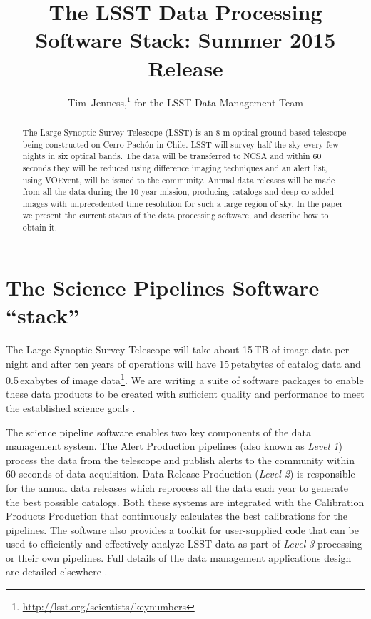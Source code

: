 \documentclass[11pt,twoside]{article}
\begin{document}
\title{The LSST Data Processing Software Stack: Summer 2015 Release}
\author{Tim~Jenness,$^1$ for the LSST Data Management Team
}


\begin{abstract}
  The Large Synoptic Survey Telescope (LSST) is an 8-m optical
  ground-based telescope being constructed on Cerro Pach\'on in
  Chile. LSST will survey half the sky every few nights in six optical
  bands. The data will be transferred to NCSA and within 60 seconds
  they will be reduced using difference imaging techniques and an
  alert list, using VOEvent, will be issued to the community. Annual
  data releases will be made from all the data during the 10-year
  mission, producing catalogs and deep co-added images with
  unprecedented time resolution for such a large region of sky. In the
  paper we present the current status of the data processing software,
  and describe how to obtain it.
\end{abstract}

\section{The Science Pipelines Software ``stack''}

The Large Synoptic Survey Telescope
\citep[LSST;][]{2008arXiv0805.2366I} will take about 15\,TB of image
data per night and after ten years of operations will have
15\,petabytes of catalog data and 0.5\,exabytes of image
data\footnote{\url{http://lsst.org/scientists/keynumbers}}. We are
writing a suite of software packages to enable these data products to
be created with sufficient quality and performance to meet the
established science goals \citep{2009arXiv0912.0201L}.

The science pipeline software enables two key components of the data
management system. The Alert Production pipelines (also known as
\emph{Level 1}) process the data from the telescope and publish alerts
to the community within 60 seconds of data acquisition. Data Release
Production (\emph{Level 2}) is responsible for the annual data
releases which reprocess all the data each year to generate the best
possible catalogs. Both these systems are integrated with the
Calibration Products Production that continuously calculates the best
calibrations for the pipelines. The software also provides a toolkit
for user-supplied code that can be used to efficiently and effectively
analyze LSST data as part of \emph{Level 3} processing or their own
pipelines. Full details of the data management applications design are
detailed elsewhere \citep{O3-1_adassxxv,LDM-151}.
\end{document}

